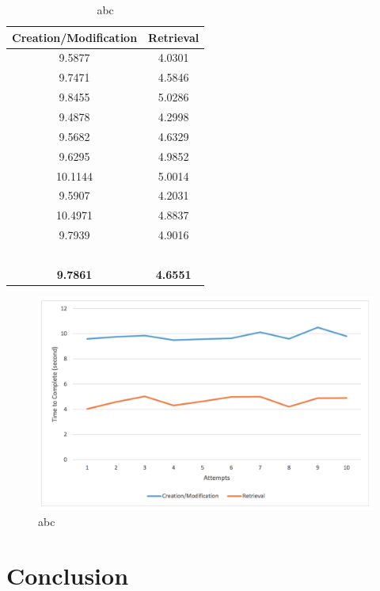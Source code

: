 \begin{table}[!ht]
\centering
\caption{abc}\label{tb:abc}
\begin{tabular}{ | c | c | }
\hline
	Creation/Modification & Retrieval \\ \hline
	9.5877 & 4.0301 \\ \hline
	9.7471 & 4.5846 \\ \hline
	9.8455 & 5.0286\\ \hline
	9.4878 & 4.2998\\ \hline
	9.5682 & 4.6329\\ \hline
	9.6295& 4.9852\\ \hline
	10.1144 & 5.0014\\ \hline
	9.5907 & 4.2031\\ \hline
	10.4971 & 4.8837\\ \hline
	9.7939& 4.9016\\ \hline
	\  & \  \\ \hline
        \textbf{9.7861}& \textbf{4.6551}\\ \hline
\end{tabular}
\end{table}

\begin{figure}[!h]
\begin{centering}
\includegraphics[scale=0.4]{pics/system_performance.png}
\caption{abc}\label{fg:system_performance}
\end{centering}
\end{figure}

\section{Conclusion}

